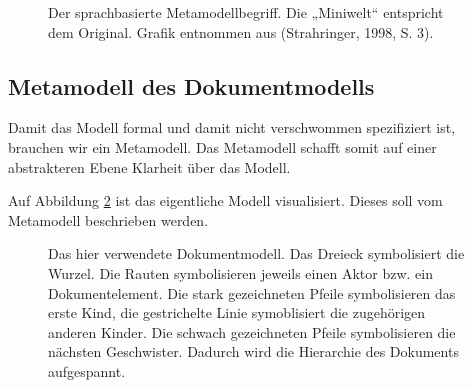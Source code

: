  
\begin{figure}[h!]
\centering
\advance\leftskip-2.5cm
\caption{ Der sprachbasierte Metamodellbegriff. Die „Miniwelt“ entspricht dem Original. Grafik entnommen aus (Strahringer, 1998, S. 3). }\label{metamodellbegriff}
\end{figure}
 
\subsection{Metamodell des Dokumentmodells}\label{metamodell_dokument}
 
Damit das Modell formal und damit nicht verschwommen spezifiziert ist, brauchen wir ein Metamodell. Das Metamodell schafft somit auf einer abstrakteren Ebene Klarheit über das Modell.

 
Auf Abbildung \ref{docmodell} ist das eigentliche Modell visualisiert. Dieses soll vom Metamodell beschrieben werden.

 
\begin{figure}[h!]
\centering
\advance\leftskip-2.5cm
\caption{ Das hier verwendete Dokumentmodell. Das Dreieck symbolisiert die Wurzel. Die Rauten symbolisieren jeweils einen Aktor bzw. ein Dokumentelement. Die stark gezeichneten Pfeile symbolisieren das erste Kind, die gestrichelte Linie symoblisiert die zugehörigen anderen Kinder. Die schwach gezeichneten Pfeile symbolisieren die nächsten Geschwister. Dadurch wird die Hierarchie des Dokuments aufgespannt. }\label{docmodell}
\end{figure}
 
